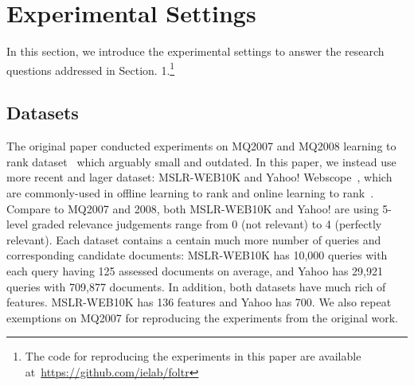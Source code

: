 \section{Experimental Settings}

In this section, we introduce the experimental settings to answer the research questions addressed in Section. 1.\footnote{The code for reproducing the experiments in this paper are available at~\url{https://github.com/ielab/foltr}} 

\subsection{Datasets}
The original paper conducted experiments on MQ2007 and MQ2008 learning to rank dataset~\cite{DBLP:journals/corr/QinL13} which arguably small and outdated. In this paper, we instead use more recent and lager dataset: MSLR-WEB10K\cite{DBLP:journals/corr/QinL13} and Yahoo! Webscope~\cite{DBLP:journals/jmlr/ChapelleC11}, which are commonly-used in offline learning to rank and online learning to rank~\cite{zhuang2020counterfactual,DBLP:conf/wsdm/HofmannSWR13,jagerman2019model,oosterhuis2018differentiable}. Compare to MQ2007 and 2008, both MSLR-WEB10K and Yahoo! are using 5-level graded relevance judgements range from 0 (not relevant) to 4 (perfectly relevant).
Each dataset contains a centain much more number of queries and corresponding candidate documents: MSLR-WEB10K has 10,000 queries with each query having 125 assessed documents on average, and Yahoo has 29,921 queries with 709,877 documents. In addition, both datasets have much rich of features.  MSLR-WEB10K has 136 features and Yahoo has 700. We also repeat exemptions on MQ2007 for reproducing the experiments from the original work.




